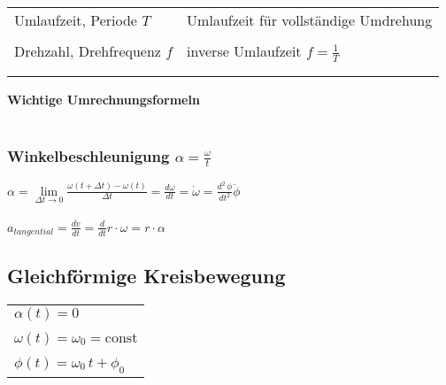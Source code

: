 		
		\begin{tabular}{ll}
		Umlaufzeit, Periode $T$ & Umlaufzeit für vollständige Umdrehung \\
		\\
		Drehzahl, Drehfrequenz $f$ & inverse Umlaufzeit   $f = \frac{1}{T}$ \\
		\\
		\\
		\end{tabular}
		 
		\textbf{Wichtige Umrechnungsformeln} \\		 
		\\
		

		
		\subsubsection{Winkelbeschleunigung $\alpha = \frac{\omega}{t}$}
		
		$\alpha = \lim \limits_{\Delta t \rightarrow 0} \frac{\omega(t + \Delta t) - \omega(t)}{\Delta t} = \frac{d \omega}{dt} = \dot{\omega} = \frac{d^2 \, \phi}{d t^2} \ddot{\phi} $ \\
		\\
		$a_{tangential} = \frac{dv}{dt} = \frac{d}{dt} r \cdot \omega = r \cdot \alpha$
		
		
		
		\subsection{Gleichförmige Kreisbewegung}
		
		\begin{tabular}{l}
		$\alpha(t) = 0$ \\
		\\
		$\omega(t) = \omega_0 = \text{const}$ \\
		\\
		$\phi(t) = \omega_0 \, t + \phi_0$ 
		\end{tabular}
		

